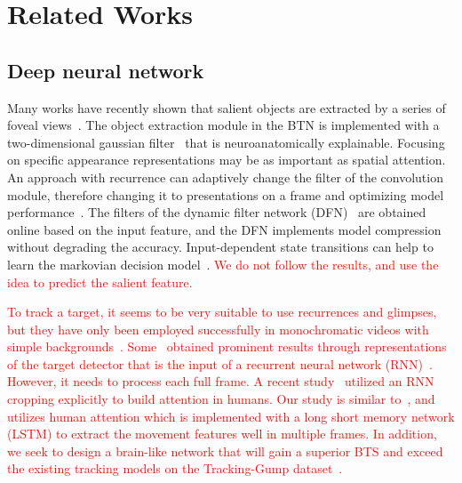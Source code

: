 \documentclass[journal]{IEEEtran}
\begin{document}
\section{Related Works} 

\subsection{Deep neural network}\par
Many works have recently shown that salient objects are extracted by a series of foveal views~\cite{mnih2014recurrent,draw}.
The object extraction module in the BTN is implemented with a two-dimensional gaussian filter~\cite{RATM} that is neuroanatomically explainable.
Focusing on specific appearance representations may be as important as spatial attention. 
An approach with recurrence can adaptively change the filter of the convolution module, therefore changing it to presentations on a frame and optimizing model performance~\cite{stollenga2014deep}. 
The filters of the dynamic filter network (DFN)~\cite{brabandere2016dynamic} are obtained online based on the input feature, and the DFN implements model compression without degrading the accuracy. 
Input-dependent state transitions can help to learn the markovian decision model~\cite{karl2017deep}. 
\textcolor{red}{
	We do not follow the results, and use the idea to predict the salient feature.} 


\textcolor{red}{
	To track a target, it seems to be very suitable to use recurrences and glimpses, but they have only been employed successfully in monochromatic videos with simple backgrounds~\cite{RATM}. 
	Some~\cite{ning2017spatially} obtained prominent results through representations of the target detector that is the input of a recurrent neural network (RNN)~\cite{su2020improved}.
	However, it needs to process each full frame. 
	A recent study~\cite{gordon2017re3} utilized an RNN cropping explicitly to build attention in humans. 
	Our study is similar to~\cite{RATM,luo2019teleoperation}, and utilizes human attention which is implemented with a long short memory network (LSTM) to extract the movement features well in multiple frames. 
	In addition, we seek to design a brain-like network that will gain a superior BTS and exceed the existing tracking models on the Tracking-Gump dataset~\cite{gaze_forrest}.
}\par
\end{document}
